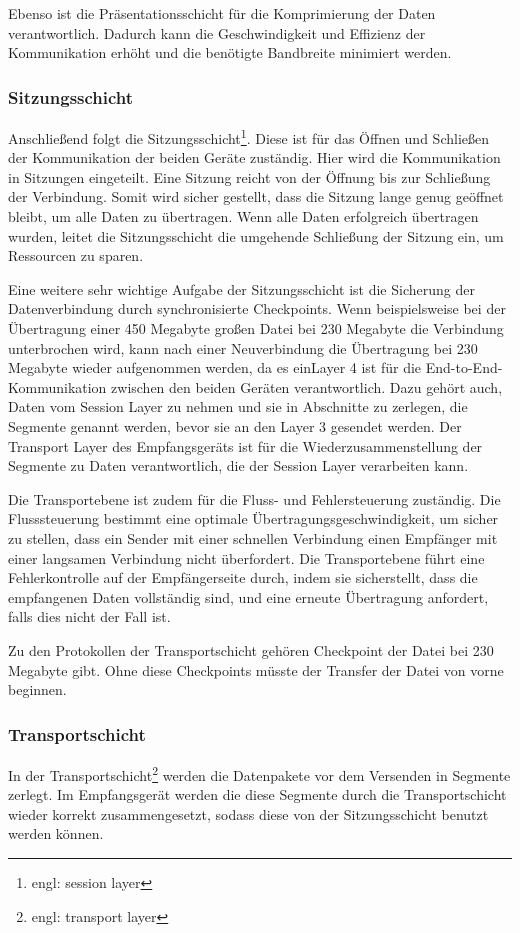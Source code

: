 \documentclass[12pt]{article}
\begin{document}
	Ebenso ist die Präsentationsschicht für die Komprimierung der Daten verantwortlich. Dadurch kann die Geschwindigkeit und Effizienz der Kommunikation erhöht und die benötigte Bandbreite minimiert werden.

\subsubsection{Sitzungsschicht}
	Anschließend folgt die Sitzungsschicht\footnote{engl: session layer}. Diese ist für das Öffnen und Schließen der Kommunikation der beiden Geräte zuständig. Hier wird die Kommunikation in Sitzungen eingeteilt. Eine Sitzung reicht von der Öffnung bis zur Schließung der Verbindung. Somit wird sicher gestellt, dass die Sitzung lange genug geöffnet bleibt, um alle Daten zu übertragen. Wenn alle Daten erfolgreich übertragen wurden, leitet die Sitzungsschicht die umgehende Schließung der Sitzung ein, um Ressourcen zu sparen. 
	
	Eine weitere sehr wichtige Aufgabe der Sitzungsschicht ist die Sicherung der Datenverbindung durch synchronisierte Checkpoints. Wenn beispielsweise bei der Übertragung einer 450 Megabyte großen Datei bei 230 Megabyte die Verbindung unterbrochen wird, kann nach einer Neuverbindung die Übertragung bei 230 Megabyte wieder aufgenommen werden, da es einLayer 4 ist für die End-to-End-Kommunikation zwischen den beiden Geräten verantwortlich. Dazu gehört auch, Daten vom Session Layer zu nehmen und sie in Abschnitte zu zerlegen, die Segmente genannt werden, bevor sie an den Layer 3 gesendet werden. Der Transport Layer des Empfangsgeräts ist für die Wiederzusammenstellung der Segmente zu Daten verantwortlich, die der Session Layer verarbeiten kann.
	
	Die Transportebene ist zudem für die Fluss- und Fehlersteuerung zuständig. Die Flusssteuerung bestimmt eine optimale Übertragungsgeschwindigkeit, um sicher zu stellen,  dass ein Sender mit einer schnellen Verbindung einen Empfänger mit einer langsamen Verbindung nicht überfordert. Die Transportebene führt eine Fehlerkontrolle auf der Empfängerseite durch, indem sie sicherstellt, dass die empfangenen Daten vollständig sind, und eine erneute Übertragung anfordert, falls dies nicht der Fall ist.
	
	Zu den Protokollen der Transportschicht gehören Checkpoint der Datei bei 230 Megabyte gibt. Ohne diese Checkpoints müsste der Transfer der Datei von vorne beginnen.

\subsubsection{Transportschicht}
 In der Transportschicht\footnote{engl: transport layer} werden die Datenpakete vor dem Versenden in Segmente zerlegt. Im Empfangsgerät werden die diese Segmente durch die Transportschicht wieder korrekt zusammengesetzt, sodass diese von der Sitzungsschicht benutzt werden können. 
 
\end{document}
